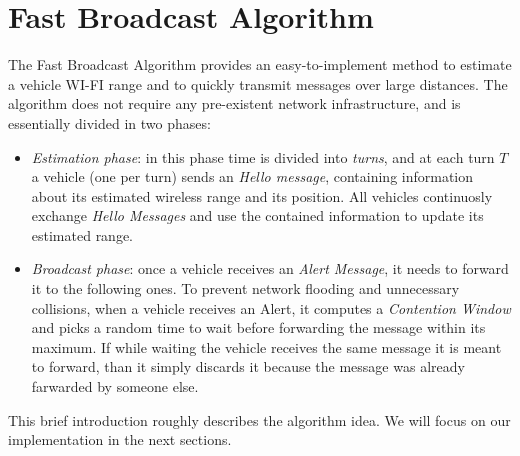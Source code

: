 \section{Fast Broadcast Algorithm}
\label{sec:fast_broadcast}
The Fast Broadcast Algorithm provides an easy-to-implement method to estimate a vehicle WI-FI range and to quickly transmit messages over large distances. The algorithm does not require any pre-existent network infrastructure, and is essentially divided in two phases:
	\begin{itemize}
		\item \emph{Estimation phase}: in this phase time is divided into \textit{turns}, and at each turn $T$ a vehicle (one per turn) sends an \emph{Hello message}, containing information about its estimated wireless range and its position. All vehicles continuosly exchange \emph{Hello Messages} and use the contained information to update its estimated range.
		\item \emph{Broadcast phase}: once a vehicle receives an \textit{Alert Message}, it needs to forward it to the following ones. To prevent network flooding and unnecessary collisions, when a vehicle receives an Alert, it computes a \textit{Contention Window} and picks a random time to wait before forwarding the message within its maximum. If while waiting the vehicle receives the same message it is meant to forward, than it simply discards it because the message was already farwarded by someone else.
	\end{itemize} 
	
This brief introduction roughly describes the algorithm idea. We will focus on our implementation in the next sections.
